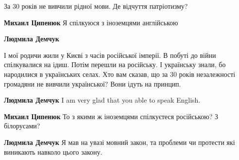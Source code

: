 \begin{itemize}
\begin{itemize}
\begin{itemize}
За 30 років не вивчили рідної мови. Де відчуття патріотизму?

 
\textbf{Михаил Ципенюк} Я спілкуюся з іноземцями англійською

 
\textbf{Людмила Демчук} 

І мої родичи жили у Києві з часів російської імперії. В побуті до війни
спілкувалися на ідиш. Потім перешли на російську. І українську знали, бо
народилися в українських селах. Хто вам сказав, що за 30 років незалежності
громадяни не вивчили української? Вони ідуть на принцип.

 
\textbf{Людмила Демчук} I am very glad that you able to speak English.

 
\textbf{Михаил Ципенюк} То з якими ж іноземцями спілкуєтеся російською? З білорусами?

 
\textbf{Людмила Демчук} Я мав на увазі мовний закон, та проблеми чи протести які виникають навколо цього закону.

 

\end{itemize}
\end{itemize}
\end{itemize}
